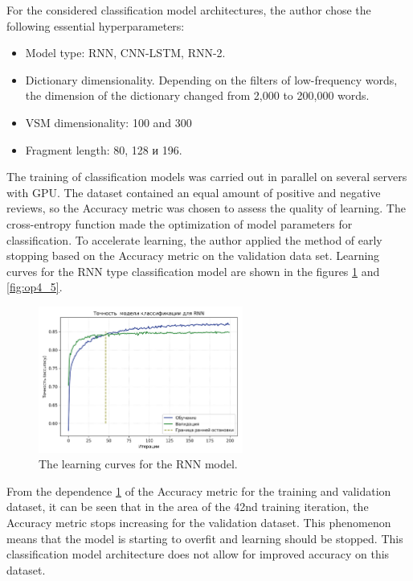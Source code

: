 \documentclass[12pt]{report}
\theoremstyle{definition}
\providecommand{\tightlist}{%
	\setlength{\itemsep}{0pt}\setlength{\parskip}{0pt}}
\begin{document}
For the considered classification model architectures, the author chose the following essential hyperparameters:

\begin{itemize}
	\tightlist
	\item Model type: RNN, CNN-LSTM, RNN-2.
	\item Dictionary dimensionality. Depending on the filters of low-frequency words, the dimension of the dictionary changed from 2,000 to 200,000 words.
	\item VSM dimensionality: 100 and 300
	\item Fragment length: 80, 128 и 196.
\end{itemize}

The training of classification models was carried out in parallel on several servers with GPU.
The dataset contained an equal amount of positive and negative reviews, so the Accuracy metric was chosen to assess the quality of learning.
The cross-entropy function made the optimization of model parameters for classification.
To accelerate learning, the author applied the method of early stopping based on the Accuracy metric on the validation data set. 
Learning curves for the RNN type classification model are shown in the figures \ref{fig:op4_4} and \ref{fig:op4_5}.

\begin{figure}[ht]
	\centering
	\includegraphics[width=0.6\textwidth]{op4_4}
	\caption{The learning curves for the RNN model.}
	\label{fig:op4_4}
\end{figure}

From the dependence \ref{fig:op4_4} of the Accuracy metric for the training and validation dataset, it can be seen that in the area of the 42nd training iteration, the Accuracy metric stops increasing for the validation dataset.
This phenomenon means that the model is starting to overfit and learning should be stopped.
This classification model architecture does not allow for improved accuracy on this dataset.
\end{document}
